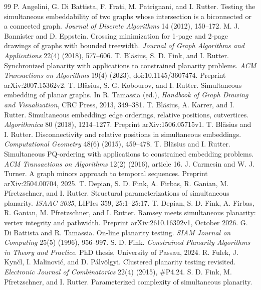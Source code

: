 \begin{thebibliography}{99}
 P. Angelini, G. Di Battista, F. Frati, M. Patrignani, and I. Rutter.
Testing the simultaneous embeddability of two graphs whose intersection is a biconnected or a connected graph.
\emph{Journal of Discrete Algorithms} 14 (2012), 150--172.
 M. J. Bannister and D. Eppstein.
Crossing minimization for 1-page and 2-page drawings of graphs with bounded treewidth.
\emph{Journal of Graph Algorithms and Applications} 22(4) (2018), 577--606.
 T. Bl\"asius, S. D. Fink, and I. Rutter.
Synchronized planarity with applications to constrained planarity problems.
\emph{ACM Transactions on Algorithms} 19(4) (2023), doi:10.1145/3607474. Preprint arXiv:2007.15362v2.
 T. Bl\"asius, S. G. Kobourov, and I. Rutter.
Simultaneous embedding of planar graphs.
In R. Tamassia (ed.), \emph{Handbook of Graph Drawing and Visualization}, CRC Press, 2013, 349--381.
 T. Bl\"asius, A. Karrer, and I. Rutter.
Simultaneous embedding: edge orderings, relative positions, cutvertices.
\emph{Algorithmica} 80 (2018), 1214--1277. Preprint arXiv:1506.05715v1.
 T. Bl\"asius and I. Rutter.
Disconnectivity and relative positions in simultaneous embeddings.
\emph{Computational Geometry} 48(6) (2015), 459--478.
 T. Bl\"asius and I. Rutter.
Simultaneous PQ-ordering with applications to constrained embedding problems.
\emph{ACM Transactions on Algorithms} 12(2) (2016), article 16.
 J. Carmesin and W. J. Turner.
A graph minors approach to temporal sequences.
Preprint arXiv:2504.00704, 2025.
 T. Depian, S. D. Fink, A. Firbas, R. Ganian, M. Pfretzschner, and I. Rutter.
Structural parameterizations of simultaneous planarity.
\emph{ISAAC 2025}, LIPIcs 359, 25:1--25:17.
 T. Depian, S. D. Fink, A. Firbas, R. Ganian, M. Pfretzschner, and I. Rutter.
Ramsey meets simultaneous planarity: vertex integrity and pathwidth.
Preprint arXiv:2610.16392v1, October 2026.
 G. Di Battista and R. Tamassia.
On-line planarity testing.
\emph{SIAM Journal on Computing} 25(5) (1996), 956--997.
 S. D. Fink.
\emph{Constrained Planarity Algorithms in Theory and Practice}.
PhD thesis, University of Passau, 2024.
 R. Fulek, J. Kyn\v{c}l, I. Malinovi\'c, and D. P\'alv\"olgyi.
Clustered planarity testing revisited.
\emph{Electronic Journal of Combinatorics} 22(4) (2015), \#P4.24.
 S. D. Fink, M. Pfretzschner, and I. Rutter.
Parameterized complexity of simultaneous planarity.

\end{thebibliography}
